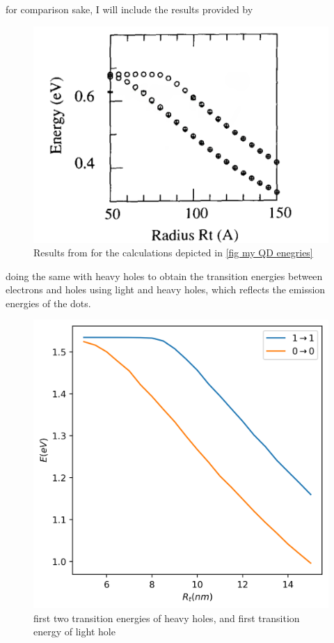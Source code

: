 \documentclass[twoside,11pt]{article}
\begin{document}
        for comparison sake, I will include the results provided by \cite{marzin1994calculation}
        \begin{figure}[h]
            \centering
            \includegraphics[scale = 0.4]{2024-04-17.png}
            \caption{Results from \cite{marzin1994calculation} for the calculations depicted in \ref{fig my QD enegries}}
            \label{results from origional paper}
        \end{figure}
    
    
        doing the same with heavy holes to obtain the transition energies between electrons and holes using light and heavy holes, which reflects the emission energies of the dots.
        \begin{figure}[h]
            \centering
            \includegraphics[scale = 0.5]{Transition Energies.png}
            \caption{first two transition energies of heavy holes, and first transition energy of light hole}
            \label{fig:transition energies}
        \end{figure}
    
\end{document}

